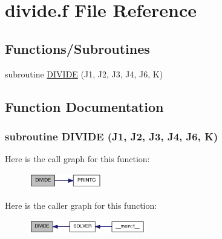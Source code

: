 \hypertarget{divide_8f}{
\section{divide.f File Reference}
\label{divide_8f}
}
\subsection*{Functions/Subroutines}
\begin{DoxyCompactItemize}
\item 
subroutine \hyperlink{divide_8f_ad00ae71118a2a8f13657f9371a13e330}{DIVIDE} (J1, J2, J3, J4, J6, K)
\end{DoxyCompactItemize}


\subsection{Function Documentation}
\hypertarget{divide_8f_ad00ae71118a2a8f13657f9371a13e330}{
\subsubsection[{DIVIDE}]{\setlength{\rightskip}{0pt plus 5cm}subroutine DIVIDE (J1, \/  J2, \/  J3, \/  J4, \/  J6, \/  K)}}
\label{divide_8f_ad00ae71118a2a8f13657f9371a13e330}


Here is the call graph for this function:\nopagebreak
\begin{figure}[H]
\begin{center}
\leavevmode
\includegraphics[width=91pt]{divide_8f_ad00ae71118a2a8f13657f9371a13e330_cgraph}
\end{center}
\end{figure}


Here is the caller graph for this function:\nopagebreak
\begin{figure}[H]
\begin{center}
\leavevmode
\includegraphics[width=144pt]{divide_8f_ad00ae71118a2a8f13657f9371a13e330_icgraph}
\end{center}
\end{figure}
